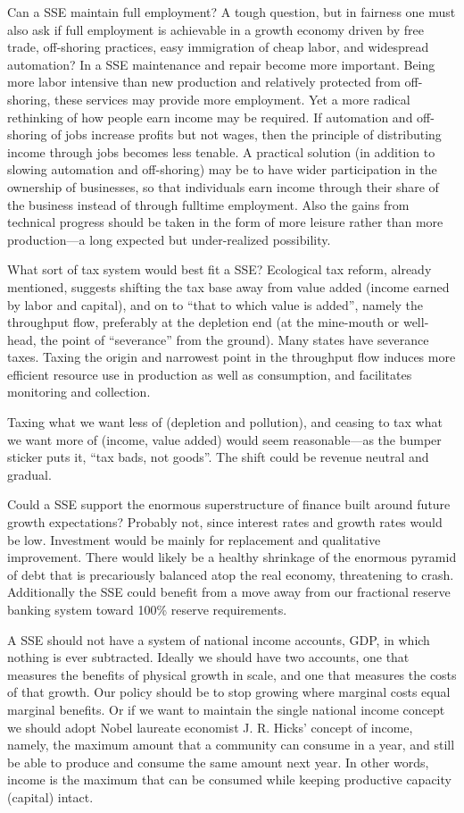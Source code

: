 \documentclass[
]{book}
\begin{document}
Can a SSE maintain full employment? A tough question, but in fairness one must also ask if full employment is
achievable in a growth economy driven by free trade, off-shoring practices, easy immigration of cheap labor, and
widespread automation? In a SSE maintenance and repair become more important. Being more labor intensive than
new production and relatively protected from off-shoring, these services may provide more employment. Yet a more
radical rethinking of how people earn income may be required. If automation and off-shoring of jobs increase
profits but not wages, then the principle of distributing income through jobs becomes less tenable. A practical
solution (in addition to slowing automation and off-shoring) may be to have wider participation in the ownership of
businesses, so that individuals earn income through their share of the business instead of through fulltime
employment. Also the gains from technical progress should be taken in the form of more leisure rather than more
production---a long expected but under-realized possibility.

What sort of tax system would best fit a SSE? Ecological tax reform, already mentioned, suggests shifting the tax base
away from value added (income earned by labor and capital), and on to ``that to which value is added'', namely the
throughput flow, preferably at the depletion end (at the mine-mouth or well-head, the point of ``severance'' from the
ground). Many states have severance taxes. Taxing the origin and narrowest point in the throughput flow induces
more efficient resource use in production as well as consumption, and facilitates monitoring and collection.

Taxing what we want less of (depletion and pollution), and ceasing to tax what we want more of (income, value
added) would seem reasonable---as the bumper sticker puts it, ``tax bads, not goods''. The shift could be revenue
neutral and gradual.

Could a SSE support the enormous superstructure of finance built around future growth expectations? Probably not,
since interest rates and growth rates would be low. Investment would be mainly for replacement and qualitative
improvement. There would likely be a healthy shrinkage of the enormous pyramid of debt that is precariously
balanced atop the real economy, threatening to crash. Additionally the SSE could benefit from a move away from our
fractional reserve banking system toward 100\% reserve requirements.

A SSE should not have a system of national income accounts, GDP, in which nothing is ever subtracted. Ideally we
should have two accounts, one that measures the benefits of physical growth in scale, and one that measures the costs
of that growth. Our policy should be to stop growing where marginal costs equal marginal benefits. Or if we want to
maintain the single national income concept we should adopt Nobel laureate economist J. R. Hicks' concept of
income, namely, the maximum amount that a community can consume in a year, and still be able to produce and
consume the same amount next year. In other words, income is the maximum that can be consumed while
keeping productive capacity (capital) intact.
\end{document}

